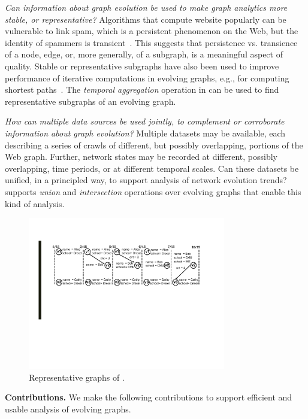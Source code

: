 {\em Can information about graph evolution be used to make graph
  analytics more stable, or representative?}  Algorithms that compute
website popularly can be vulnerable to link spam, which is a
persistent phenomenon on the Web, but the identity of spammers is
transient~\cite{DBLP:conf/cikm/YangQZGL07}.  This suggests that
persistence vs. transience of a node, edge, or, more generally, of a
subgraph, is a meaningful aspect of quality.  Stable or representative
subgraphs have also been used to improve performance of iterative
computations in evolving graphs, e.g., for computing shortest
paths~\cite{Ren2011}.  The {\em temporal aggregation} operation in \ql
{}can be used to find
representative subgraphs of an evolving graph.

{\em How can multiple data sources be used jointly, to complement or
  corroborate information about graph evolution?}  Multiple datasets may be available, each describing a
series of crawls of different, but possibly overlapping, portions of
the Web graph.  Further, network states may be recorded at different,
possibly overlapping, time periods, or at different temporal scales.
Can these datasets be unified, in a principled way, to support
analysis of network evolution trends?  \ql
supports {\em union} and {\em intersection} operations over evolving
graphs that enable this kind of analysis.

\begin{figure}[t!]
\includegraphics[width=3.4in]{figs/T1_graphs.pdf}
\vspace{-0.5cm}
\caption{Representative graphs of \tg {}.}
\vspace{-0.4cm}
\label{fig:tg_rg}
\end{figure}

{\bf Contributions.} We make the following contributions to support
efficient and usable analysis of evolving graphs.

